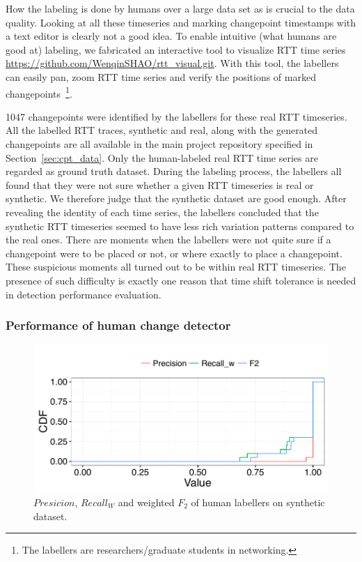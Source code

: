 How the labeling is done by humans over a large data set as is crucial to the data quality.
Looking at all these timeseries and marking changepoint timestamps with a text editor is clearly not a good idea.
To enable intuitive (what humans are good at) labeling, we fabricated an interactive tool to visualize RTT time series \url{https://github.com/WenqinSHAO/rtt_visual.git}.
With this tool, the labellers can easily pan, zoom RTT time series and verify the positions of marked changepoints~\footnote{The labellers are researchers/graduate students in networking.}.

1047 changepoints were identified by the labellers for these real RTT timeseries.
All the labelled RTT traces, synthetic and real, along with the generated changepoints are all available in the main project repository specified in Section~\ref{sec:cpt_data}.
Only the human-labeled real RTT time series are regarded as ground truth dataset.
During the labeling process, the labellers all found that they were not sure whether a given RTT timeseries is real or synthetic.
We therefore judge that the synthetic dataset are good enough.
After revealing the identity of each time series, the labellers concluded that the synthetic RTT timeseries seemed to have less rich variation patterns compared to the real ones.
There are moments when the labellers were not quite sure if a changepoint were to be placed or not, or where exactly to place a changepoint.
These suspicious moments all turned out to be within real RTT timeseries.
The presence of such difficulty is exactly one reason that time shift tolerance is needed in detection performance evaluation.

\subsubsection{Performance of human change detector}
\begin{figure}[!htb]
\centering
\includegraphics[width=.72\textwidth]{gfx/chap4/antoine_eval.pdf}
\caption{$Presicion$, $Recall_W$ and weighted $F_2$ of human labellers on synthetic dataset.}
\label{fig:antoine_eval}
\end{figure}

